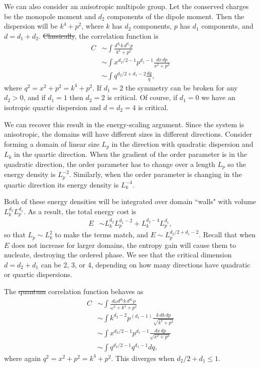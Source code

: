 \documentclass[pra,aps,twocolumn, amsfonts,amsmath,amssymb,nofootinbib,superscriptaddress]{revtex4-2}
\newcommand{\nn}{\nonumber\\}
\providecommand{\DIFaddtex}[1]{{\protect\color{blue}\uwave{#1}}} %
\providecommand{\DIFdeltex}[1]{{\protect\color{red}\sout{#1}}}                      %
\providecommand{\DIFaddbegin}{} %
\providecommand{\DIFaddend}{} %
\providecommand{\DIFdelbegin}{} %
\providecommand{\DIFdelend}{} %
\providecommand{\DIFadd}[1]{\texorpdfstring{\DIFaddtex{#1}}{#1}} %
\providecommand{\DIFdel}[1]{\texorpdfstring{\DIFdeltex{#1}}{}} %
\newcommand{\DIFscaledelfig}{0.5}
\newlength{\DIFdelgraphicswidth} %
\newlength{\DIFdelgraphicsheight} %
\newcommand{\DIFaddincludegraphics}[2][]{{\color{blue}\fbox{\DIFOincludegraphics[#1]{#2}}}} %
\newcommand{\DIFdelincludegraphics}[2][]{%
\sbox{\DIFdelgraphicsbox}{\DIFOincludegraphics[#1]{#2}}%
\settoboxwidth{\DIFdelgraphicswidth}{\DIFdelgraphicsbox} %
\settoboxtotalheight{\DIFdelgraphicsheight}{\DIFdelgraphicsbox} %
\scalebox{\DIFscaledelfig}{%
\parbox[b]{\DIFdelgraphicswidth}{\usebox{\DIFdelgraphicsbox}\\[-\baselineskip] \rule{\DIFdelgraphicswidth}{0em}}\llap{\resizebox{\DIFdelgraphicswidth}{\DIFdelgraphicsheight}{%
\setlength{\unitlength}{\DIFdelgraphicswidth}%
\begin{picture}(1,1)%
\thicklines\linethickness{2pt} %
{\color[rgb]{1,0,0}\put(0,0){\framebox(1,1){}}}%
{\color[rgb]{1,0,0}\put(0,0){\line( 1,1){1}}}%
{\color[rgb]{1,0,0}\put(0,1){\line(1,-1){1}}}%
\end{picture}%
}\hspace*{3pt}}} %
} %
\DeclareRobustCommand{\DIFaddbegin}{\DIFOaddbegin \let\includegraphics\DIFaddincludegraphics} %
\DeclareRobustCommand{\DIFaddend}{\DIFOaddend \let\includegraphics\DIFOincludegraphics} %
\DeclareRobustCommand{\DIFdelbegin}{\DIFOdelbegin \let\includegraphics\DIFdelincludegraphics} %
\DeclareRobustCommand{\DIFdelend}{\DIFOaddend \let\includegraphics\DIFOincludegraphics} %
\begin{document}
We can also consider an anisotropic multipole group. 
Let the conserved charges be the monopole moment and $d_2$ components of the dipole moment. Then the dispersion will be $k^4 + p^2$, where $k$ has $d_2$ components, $p$ has $d_1$ components, and $d = d_1+d_2$. \DIFdelbegin \DIFdel{Classically}\DIFdelend \DIFaddbegin \DIFadd{At nonzero temperature}\DIFaddend , the correlation function is
\begin{align}
C &\sim \int \frac{d^{d_2} k \, d^{d_1} p}{k^4 + p^2}\nn
&\sim \int x^{d_2/2 -1} p^{d_1-1} \frac{dx\, dp}{x^2 +p^2} \nn
&\sim \int q^{d_2/2 + d_1 - 2}\frac{dq}{q},
\end{align}
where $q^2 = x^2 + p^2 = k^4 + p^2$. 
If $d_1=2$ the symmetry can be broken for any $d_2>0$, and if $d_1=1$ then $d_2=2$  is critical. Of course, if $d_1=0$ we have an isotropic quartic dispersion and $d=d_2=4$ is critical. 

We can recover this result in  the energy-scaling argument. Since the system is anisotropic, the domains will have different sizes in different directions. Consider forming a domain of linear size $L_p$ in the  direction with quadratic dispersion and $L_k$ in the quartic direction. When the gradient of the order parameter is in the quadratic direction, the order parameter has to change over a length $L_p$ so the energy density is $L_p^{-2}$. Similarly, when the order parameter is changing in the quartic direction its energy density is $L_k^{-4}$. 

Both of these energy densities will be integrated over domain ``walls" with volume $L_k^{d_2} L_p^{d_1}$.
As a result, the total energy cost is
\begin{align}
E &\sim L_k^{d_2} L_p^{d_1-2} + L_k^{d_2-4} L_p^{d_1},
\end{align}
so that $L_p \sim L_k^2$ to make the terms match, and $E\sim L_p^{d_2/2+d_1-2}$. Recall that when $E$ does not increase for larger domains, the entropy gain will cause them to nucleate, destroying the ordered phase.
We see that the critical dimension $d= d_2 + d_1$ can be 2, 3, or 4, depending on how many directions have quadratic or quartic dispersions.

The \DIFdelbegin \DIFdel{quantum }\DIFdelend \DIFaddbegin \DIFadd{$T=0$ }\DIFaddend correlation function behaves as
\begin{align}
C &\sim \int \frac{d\omega d^{d_2} k \, d^{d_1} p}{\omega^2 + k^4 + p^2}\nn
&\sim \int k^{d_2 - 2} p^{ (d_1-1)} \frac{k\,dk\, dp}{\sqrt{k^4 + p^2}} \nn
&\sim \int x^{d_2/2-1} p^{d_1-1} \frac{dx\, dp}{\sqrt{x^2 + p^2}} \nn
&\sim \int q^{d_2/2 -1} q^{d_1 -1} dq,
\end{align}
where again $q^2 = x^2 + p^2 = k^4 + p^2$. This diverges when $d_2/2 + d_1 \le 1$. 
\end{document}
